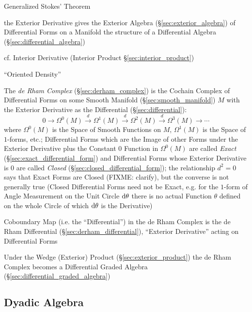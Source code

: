 Generalized Stokes' Theorem

the Exterior Derivative gives the Exterior Algebra
(\S\ref{sec:exterior_algebra}) of Differential Forms on a Manifold the structure
of a Differential Algebra (\S\ref{sec:differential_algebra})

\fist cf. Interior Derivative (Interior Product \S\ref{sec:interior_product})

``Oriented Density'' %

\asterism

The \emph{de Rham Complex} (\S\ref{sec:derham_complex}) is the Cochain Complex
of Differential Forms on some Smooth Manifold (\S\ref{sec:smooth_manifold}) $M$
with the Exterior Derivative as the Differential (\S\ref{sec:differential}):
\[
  0 \rightarrow \Omega^0(M) \xrightarrow{d} \Omega^1(M) \xrightarrow{d}
  \Omega^2(M) \xrightarrow{d} \Omega^3(M) \rightarrow \cdots
\]
where $\Omega^0(M)$ is the Space of Smooth Functions on $M$, $\Omega^1(M)$ is
the Space of $1$-forms, etc.; Differential Forms which are the Image of other
Forms under the Exterior Derivative plus the Constant $0$ Function in
$\Omega^0(M)$ are called \emph{Exact} (\S\ref{sec:exact_differential_form}) and
Differential Forms whose Exterior Derivative is $0$ are called \emph{Closed}
(\S\ref{sec:closed_differential_form}); the relationship $d^2 = 0$ says that
Exact Forms are Closed (FIXME: clarify), but the converse is not generally true
(Closed Differential Forms need not be Exact, e.g. for the $1$-form of Angle
Measurement on the Unit Circle $\mathrm{d}\theta$ there is no actual Function
$\theta$ defined on the whole Circle of which $\mathrm{d}\theta$ is the
Derivative)

Coboundary Map (i.e. the ``Differential'') in the de Rham Complex is the de Rham
Differential (\S\ref{sec:derham_differential}), ``Exterior Derivative'' acting
on Differential Forms

Under the Wedge (Exterior) Product (\S\ref{sec:exterior_product}) the de Rham
Complex becomes a Differential Graded Algebra
(\S\ref{sec:differential_graded_algebra})



\subsection{Dyadic Algebra}\label{sec:dyadic_algebra}

